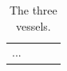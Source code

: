 \begin{table}[htbp]
    \centering
    \caption{The three vessels.}
    \label{tab:vessels}
    \begin{tabular}{lllr}
        ...
    \end{tabular}
\end{table}
